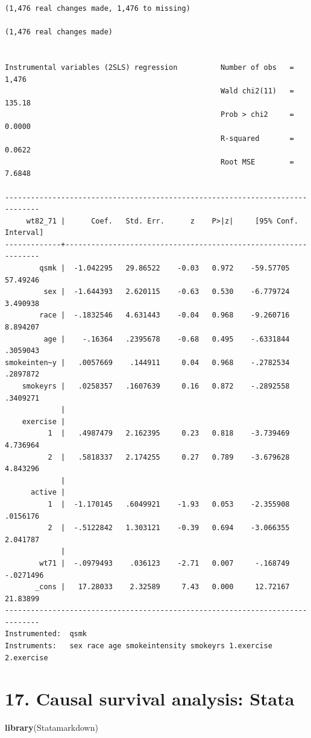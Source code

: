 \documentclass[
  10pt,
]{book}
\newenvironment{Shaded}{\begin{snugshade}}{\end{snugshade}}
\newcommand{\KeywordTok}[1]{\textcolor[rgb]{0.13,0.29,0.53}{\textbf{#1}}}
\newcommand{\NormalTok}[1]{#1}
\begin{document}
\begin{verbatim}
(1,476 real changes made, 1,476 to missing)

(1,476 real changes made)


Instrumental variables (2SLS) regression          Number of obs   =      1,476
                                                  Wald chi2(11)   =     135.18
                                                  Prob > chi2     =     0.0000
                                                  R-squared       =     0.0622
                                                  Root MSE        =     7.6848

------------------------------------------------------------------------------
     wt82_71 |      Coef.   Std. Err.      z    P>|z|     [95% Conf. Interval]
-------------+----------------------------------------------------------------
        qsmk |  -1.042295   29.86522    -0.03   0.972    -59.57705    57.49246
         sex |  -1.644393   2.620115    -0.63   0.530    -6.779724    3.490938
        race |  -.1832546   4.631443    -0.04   0.968    -9.260716    8.894207
         age |    -.16364   .2395678    -0.68   0.495    -.6331844    .3059043
smokeinten~y |   .0057669    .144911     0.04   0.968    -.2782534    .2897872
    smokeyrs |   .0258357   .1607639     0.16   0.872    -.2892558    .3409271
             |
    exercise |
          1  |   .4987479   2.162395     0.23   0.818    -3.739469    4.736964
          2  |   .5818337   2.174255     0.27   0.789    -3.679628    4.843296
             |
      active |
          1  |  -1.170145   .6049921    -1.93   0.053    -2.355908    .0156176
          2  |  -.5122842   1.303121    -0.39   0.694    -3.066355    2.041787
             |
        wt71 |  -.0979493    .036123    -2.71   0.007     -.168749   -.0271496
       _cons |   17.28033    2.32589     7.43   0.000     12.72167    21.83899
------------------------------------------------------------------------------
Instrumented:  qsmk
Instruments:   sex race age smokeintensity smokeyrs 1.exercise 2.exercise
\end{verbatim}

\hypertarget{causal-survival-analysis-stata}{%
\chapter*{17. Causal survival analysis: Stata}\label{causal-survival-analysis-stata}}

\begin{Shaded}
\begin{Highlighting}[]
\KeywordTok{library}\NormalTok{(Statamarkdown)}
\end{Highlighting}
\end{Shaded}
\end{document}
